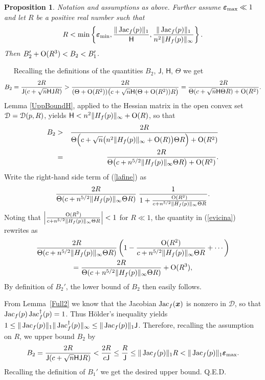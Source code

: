 \documentclass[10pt]{article}
\newcommand\qed{{\hspace*{\fill}Q.E.D.\vskip12pt plus 1pt}}
\newcommand\sD{{\cal D}}
\newcommand\proof{\noindent{\em Proof.}\ \ } \newcommand\mult{\mbox{\rm mult}}
\newcommand{\epsbold}{{\bm \varepsilon}}
\def\Jac{\mathop{\rm Jac}\nolimits}
\newtheorem{prop}[theorem]{Proposition}
\begin{document}
{\begin{prop}\label{PropB1B2} Notation and assumptions as above. Further assume $\epsbold_{{\rm max}}\ll 1$ and let $R$ be a positive real number such that
$$
R < \min\left \{\epsbold_{{\rm min}}, \frac{\|\Jac_f(p)\|_1}{\mathsf H},
\frac{\|\Jac_f(p)\|_1}{n^2 \|H_f(p)\|_\infty} \right\}.
$$  Then 
$B_2' +{\rm O}(R^3) < B_2 < B_1' $.
\end{prop}
\proof 
Recalling the definitions of the quantities
$B_2$, $\mathsf J$, $\mathsf H$, $\Theta$  we get
$$
B_2 = \frac{2R}{{\mathsf J}(c+\sqrt{n}\mathsf H {\mathsf J} R)}  >
\frac{2R}{(\Theta + {\rm O}(R^2))\big(c+\sqrt{n}\mathsf H (\Theta + {\rm O}(R^2)) R\big)} 
= \frac{2R}{\Theta (c+\sqrt{n}\mathsf H \Theta R)+ {\rm O}(R^2)}. 
$$
  Lemma \ref{UppBoundH}, applied  to the Hessian matrix  in the open convex set $\sD=\sD(p,R)$, yields $\mathsf H < n^2 \|H_f(p)\|_\infty + {\rm O}(R)$, so that 
\begin{eqnarray}\label{lafine} \nonumber
B_2&>&   \frac{2R}{\Theta \Big(c+\sqrt{n}\big(n^2 \|H_f(p)\|_\infty+{\rm O}(R)\big) \Theta R\Big)+ {\rm O}(R^2)} \\  
&=& \frac{2R}{\Theta \big(c+n^{5/2} \|H_f(p)\|_\infty \Theta R\big)+ {\rm O}(R^2)}.
\end{eqnarray}	
Write the right-hand side term of (\ref{lafine}) as
\begin{equation}\label{evicina}
\frac{2R}{\Theta (c+n^{5/2} \|H_f(p)\|_\infty\Theta R)}\; \frac{1}{1+\frac{{\rm O}(R^2)}{c+n^{5/2} \|H_f(p)\|_\infty\Theta R}}.
\end{equation}
Noting that
$\left | \frac{{\rm O}(R^2)}{c+n^{5/2} \|H_f(p)\|_\infty\Theta R} \right |<1$ for $R  \ll 1$, the quantity in (\ref{evicina}) rewrites as
\begin{multline*} 
\frac{2R}{\Theta (c+n^{5/2} \|H_f(p)\|_\infty\Theta R)}\left(1-\frac{{\rm O}(R^2)}{c+n^{5/2} \|H_f(p)\|_\infty\Theta R}+\cdots\right)  \\
  = \frac{2R}{\Theta (c+n^{5/2} \|H_f(p)\|_\infty\Theta R)} + {\rm O}(R^3),
\end{multline*}
By  definition of $B_2'$, the lower bound of $B_2$ then easily follows.


From Lemma~\ref{Full2} we know that the Jacobian 
$\Jac_f(\bm x)$ is nonzero in $\mathcal D$,
so  that 
$\Jac_f(p) \Jac_f^\dagger(p) =1$. Thus  H\"older's inequality yields
$
1  \le \| \Jac_f(p)\|_1 \| \Jac_f^\dagger(p)\|_\infty \le
\|\Jac_f(p)\|_1\mathsf J 
$.
Therefore, recalling  the assumption on $R$,  we  upper bound  $B_2$  by
\begin{equation}\label{serve}
B_2 = \frac{2R}{\mathsf J(c+\sqrt{n}{\mathsf H} \mathsf J  R)} < \frac{2R}{c\mathsf J} 
\le \frac{R}{\mathsf J} \le \|\Jac_f(p)\|_1 R < \|\Jac_f(p)\|_1 \epsbold_{\rm max}.
\end{equation}
Recalling the definition of $B_1'$ we get the desired upper bound.
\qed




}
\end{document}
